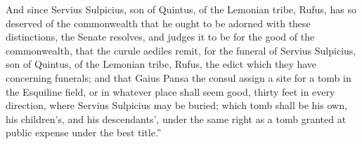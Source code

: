  And since Servius Sulpicius, son of Quintus, of the Lemonian tribe, Rufus, has so deserved of the commonwealth that he ought to be adorned with these distinctions, the Senate resolves, and judges it to be for the good of the commonwealth, that the curule aediles remit, for the funeral of Servius Sulpicius, son of Quintus, of the Lemonian tribe, Rufus, the edict which they have concerning funerals; and that Gaius Pansa the consul assign a site for a tomb in the Esquiline field, or in whatever place shall seem good, thirty feet in every direction, where Servius Sulpicius may be buried; which tomb shall be his own, his children's, and his descendants', under the same right as a tomb granted at public expense under the best title.''
